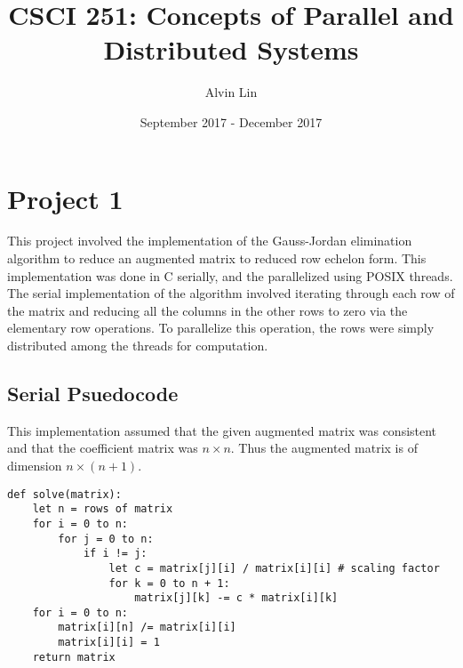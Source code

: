 \documentclass[letterpaper, 12pt]{math}
\title{CSCI 251: Concepts of Parallel and Distributed Systems}
\author{Alvin Lin}
\date{September 2017 - December 2017}
\begin{document}
\maketitle

\section*{Project 1}
This project involved the implementation of the Gauss-Jordan elimination
algorithm to reduce an augmented matrix to reduced row echelon form. This
implementation was done in C serially, and the parallelized using POSIX threads.
The serial implementation of the algorithm involved iterating through each
row of the matrix and reducing all the columns in the other rows to zero via
the elementary row operations. To parallelize this operation, the rows were
simply distributed among the threads for computation.

\subsection*{Serial Psuedocode}
This implementation assumed that the given augmented matrix was consistent
and that the coefficient matrix was \( n\times n \). Thus the augmented matrix
is of dimension \( n\times (n+1) \).
\begin{lstlisting}
def solve(matrix):
    let n = rows of matrix
    for i = 0 to n:
        for j = 0 to n:
            if i != j:
                let c = matrix[j][i] / matrix[i][i] # scaling factor
                for k = 0 to n + 1:
                    matrix[j][k] -= c * matrix[i][k]
    for i = 0 to n:
        matrix[i][n] /= matrix[i][i]
        matrix[i][i] = 1
    return matrix
\end{lstlisting}
\end{document}
